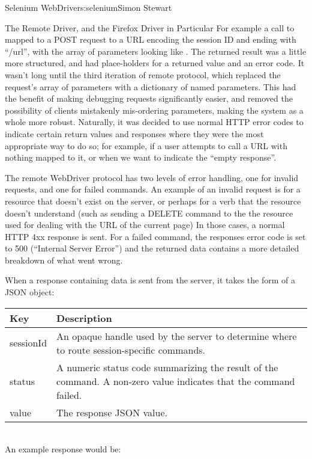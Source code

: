 \begin{aosachapter}{Selenium WebDriver}{s:selenium}{Simon Stewart}
\begin{aosasect1}{The Remote Driver, and the Firefox Driver in Particular}
For example a call to 
mapped to a POST request to a URL encoding the session ID and ending
with ``/url'', with the array of parameters looking like
.  The returned result was a
little more structured, and had place-holders for a returned value and
an error code.  It wasn't long until the third iteration of remote
protocol, which replaced the request's array of parameters with a
dictionary of named parameters. This had the benefit of making
debugging requests significantly easier, and removed the possibility
of clients mistakenly mis-ordering parameters, making the system as a
whole more robust.  Naturally, it was decided to use normal HTTP error
codes to indicate certain return values and responses where they were
the most appropriate way to do so; for example, if a user attempts to
call a URL with nothing mapped to it, or when we want to indicate the
``empty response''.

The remote WebDriver protocol has two levels of error handling, one
for invalid requests, and one for failed commands. An example of an
invalid request is for a resource that doesn't exist on the server, or
perhaps for a verb that the resource doesn't understand (such as
sending a DELETE command to the the resource used for dealing with the
URL of the current page) In those cases, a normal HTTP 4xx response is
sent. For a failed command, the responses error code is set to 500
(``Internal Server Error'') and the returned data contains a more
detailed breakdown of what went wrong.

When a response containing data is sent from the server, it takes the
form of a JSON object:\\

\begin{tabular}{|lp{4in}|}
\hline
Key & Description \\
\hline
sessionId & An opaque handle used by the server to determine where to route session-specific commands. \\
status & A numeric status code summarizing the result of the command. A non-zero value indicates that the command failed. \\
value & The response JSON value. \\
\hline
\end{tabular}

~\\

\noindent
An example response would be:


\end{aosasect1}
\end{aosachapter}

